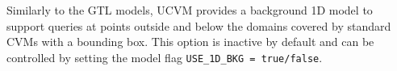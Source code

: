 Similarly to the GTL models, UCVM provides a background 1D model to support queries at points outside and below the domains covered by standard CVMs with a bounding box. This option is inactive by default and can be controlled by setting the model flag \texttt{USE\_1D\_BKG = true/false}.





%

%
%
%
%
% 
%



